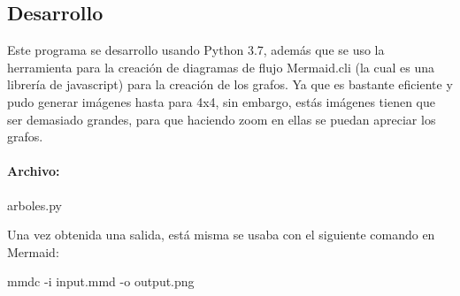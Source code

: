 \subsection{Desarrollo}
	Este programa se desarrollo usando Python 3.7, además que se uso la herramienta para la creación de diagramas de flujo Mermaid.cli (la cual es una librería de javascript) para la creación de los grafos. Ya que es bastante eficiente y pudo generar imágenes hasta para 4x4, sin embargo, estás imágenes tienen que ser demasiado grandes, para que haciendo zoom en ellas se puedan apreciar los grafos.

	\paragraph{Archivo: } arboles.py
	
	
	Una vez obtenida una salida, está misma se usaba con el siguiente comando en Mermaid:
	
	
	mmdc -i input.mmd -o output.png
